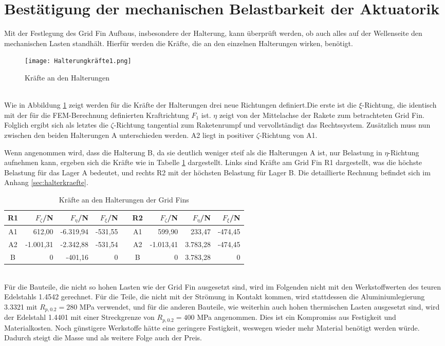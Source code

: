 \section{Bestätigung der mechanischen Belastbarkeit der Aktuatorik}
Mit der Festlegung des Grid Fin Aufbaus, insbesondere der Halterung, kann überprüft werden, ob auch alles auf der Wellenseite den mechanischen Lasten standhält. Hierfür werden die Kräfte, die an den einzelnen Halterungen wirken, benötigt.
\begin{figure}[h] 
	\centering
	\texttt{[image: Halterungkräfte1.png]}
	\caption{Kräfte an den Halterungen}
	\label{abb_richtungen_Halterungskräfte}
\end{figure}\\
Wie in Abbildung \ref{abb_richtungen_Halterungskräfte} zeigt werden für die Kräfte der Halterungen drei neue Richtungen definiert.Die erste ist die $\xi$-Richtung, die identisch mit der für die FEM-Berechnung definierten Kraftrichtung $F_1$ ist. $\eta$ zeigt von der Mittelachse der Rakete zum betrachteten Grid Fin. Folglich ergibt sich als letztes die $\zeta$-Richtung tangential zum Raketenrumpf und vervollständigt das Rechtssystem. Zusätzlich muss nun zwischen den beiden Halterungen A unterschieden werden. A2 liegt in positiver $\zeta$-Richtung von A1.

 Wenn angenommen wird, dass die Halterung B, da sie deutlich weniger steif als die Halterungen A ist, nur Belastung in $\eta$-Richtung aufnehmen kann, ergeben sich die Kräfte wie in Tabelle \ref{tab_Haltekräfte} dargestellt. Links sind Kräfte am Grid Fin R1 dargestellt, was die höchste Belastung für das Lager A bedeutet, und rechts R2 mit der höchsten Belastung für Lager B. Die detaillierte Rechnung befindet sich im Anhang \ref{sec:halterkraefte}. 
\begin{table}[h] 
	\centering 
	\caption{Kräfte an den Halterungen der Grid Fins}
	\label{tab_Haltekräfte}
	\begin{tabular}{c|r|r|rc||c|r|r|r} 
		\textbf{R1}&$F_{\zeta}$/N&$F_\eta$/N&$F_\xi$/N&&\textbf{R2}&$F_{\zeta}$/N&$F_\eta$/N&$F_\xi$/N\\ 
		\hline 
		A1& 612,00&-6.319,94&-531,55&&A1&599,90&233,47&-474,45\\
		A2&-1.001,31&-2.342,88&-531,54&&A2&-1.013,41&3.783,28&-474,45\\
		B&0&-401,16&0&&B&0&3.783,28&0\\
	\end{tabular}
\end{table} \\
Für die Bauteile, die nicht so hohen Lasten wie der Grid Fin ausgesetzt sind, wird im Folgenden nicht mit den Werkstoffwerten des teuren Edelstahls 1.4542 gerechnet. Für die Teile, die nicht mit der Strömung in Kontakt kommen, wird stattdessen die Aluminiumlegierung 3.3321 mit $R_{p,0.2} = 280$ MPa verwendet, und für die anderen Bauteile, wie weiterhin auch hohen thermischen Lasten ausgesetzt sind, wird der Edelstahl 1.4401 mit einer Streckgrenze von $R_{p,0.2} = 400$ MPa angenommen. Dies ist ein Kompromiss aus Festigkeit und Materialkosten. Noch günstigere Werkstoffe hätte eine geringere Festigkeit, weswegen wieder mehr Material benötigt werden würde. Dadurch steigt die Masse und als weitere Folge auch der Preis.
